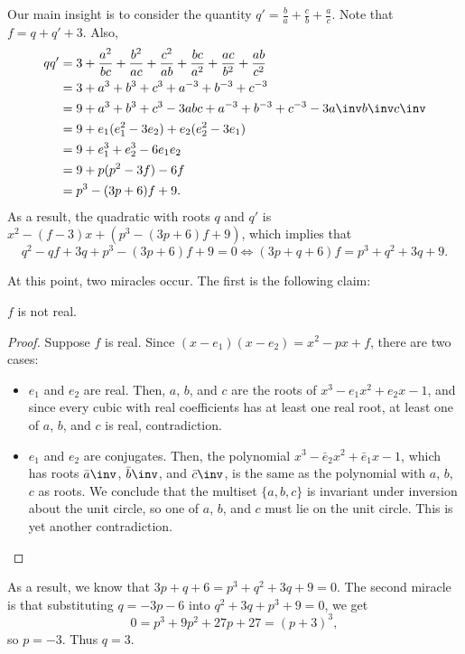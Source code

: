 Our main insight is to consider the quantity
$q' = \frac{b}{a} + \frac{c}{b} + \frac{a}{c}$.
Note that $f = q + q' + 3$. Also,
\begin{align*}
  qq' &= 3 + \frac{a^2}{bc} + \frac{b^2}{ac} + \frac{c^2}{ab}
    + \frac{bc}{a^2} + \frac{ac}{b^2} + \frac{ab}{c^2} \\
  &= 3 + a^3 + b^3 + c^3 + a^{-3} + b^{-3} + c^{-3} \\
  &= 9 + a^3 + b^3 + c^3 - 3abc + a^{-3} + b^{-3} + c^{-3} - 3a\inv b\inv c\inv \\
  &= 9 + e_1(e_1^2 - 3e_2) + e_2(e_2^2 - 3e_1) \\
  &= 9 + e_1^3 + e_2^3 - 6e_1e_2 \\
  &= 9 + p(p^2 - 3f) - 6f \\
  &= p^3 - (3p + 6)f + 9.
  \end{align*}
As a result, the quadratic with roots $q$ and $q'$ is
$x^2 - (f - 3)x + (p^3 - (3p+6) f + 9)$, which implies that
\[ q^2 - qf + 3q + p^3 - (3p + 6)f + 9 = 0
  \iff (3p + q + 6)f = p^3 + q^2 + 3q + 9. \]

At this point, two miracles occur.
The first is the following claim:
\begin{claim*}
  $f$ is not real.
\end{claim*}
\begin{proof}
  Suppose $f$ is real. Since $(x - e_1)(x - e_2) = x^2 - px + f$, there are two cases:
  \begin{itemize}
  \item $e_1$ and $e_2$ are real.
    Then, $a$, $b$, and $c$ are the roots of $x^3 - e_1 x^2 + e_2 x - 1$,
    and since every cubic with real coefficients has at least one real root,
    at least one of $a$, $b$, and $c$ is real, contradiction.
  \item $e_1$ and $e_2$ are conjugates.
    Then, the polynomial $x^3 - \bar e_2 x^2 + \bar e_1 x - 1$,
    which has roots $\bar a\inv$, $\bar b \inv$, and $\bar c \inv$,
    is the same as the polynomial with $a$, $b$, $c$ as roots.
    We conclude that the multiset $\{a, b, c\}$ is invariant
    under inversion about the unit circle,
    so one of $a$, $b$, and $c$ must lie on the unit circle.
    This is yet another contradiction. \qedhere
  \end{itemize}
\end{proof}

As a result, we know that $3p + q + 6 = p^3 + q^2 + 3q + 9 = 0$.
The second miracle is that substituting $q = -3p-6$ into
$q^2 + 3q + p^3 + 9 = 0$, we get
\[ 0 = p^3 + 9p^2 + 27p + 27 = (p + 3)^3, \]
so $p = -3$.
Thus $q = 3$.

